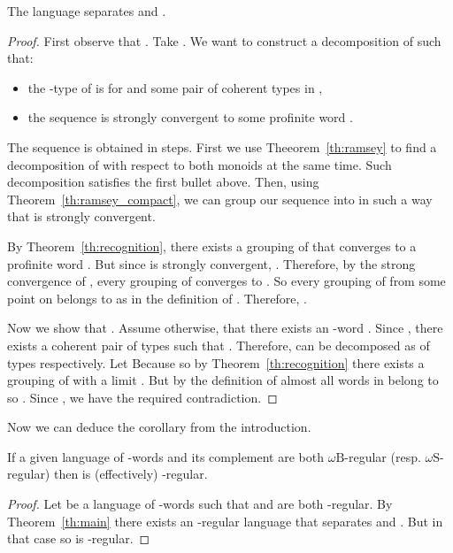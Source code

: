 \documentclass{LMCS}
\newcommand{\wB}{\ensuremath{\omega \mathrm{B}}\xspace}
\newcommand{\wS}{\ensuremath{\omega \mathrm{S}}\xspace}
\begin{document}
\begin{lemma}
The language  separates  and .
\end{lemma}

\begin{proof}
First observe that . Take . We want to construct a decomposition  of  such that:
\begin{itemize}
\item the -type of  is  for  and some pair of coherent types  in ,
\item the sequence  is strongly convergent to some profinite word .
\end{itemize}

The sequence  is obtained in steps. First we use Theeorem~\ref{th:ramsey} to find a decomposition of  with respect to both monoids  at the same time. Such decomposition satisfies the first bullet above. Then, using Theorem~\ref{th:ramsey_compact}, we can group our sequence into  in such a way that  is strongly convergent.

By Theorem~\ref{th:recognition}, there exists a grouping  of  that converges to a profinite word . But since  is strongly convergent, . Therefore, by the strong convergence of , every grouping of  converges to . So every grouping of  from some point on belongs to  as in the definition of . Therefore, .

Now we show that . Assume otherwise, that there exists an -word . Since , there exists a coherent pair of types  such that . Therefore,  can be decomposed as  of types  respectively. Let  Because  so by Theorem~\ref{th:recognition} there exists a grouping  of  with a limit  . But by the definition of  almost all words in  belong to  so . Since , we have the required contradiction.
\end{proof}

Now we can deduce the corollary from the introduction.

\begin{corollary}\label{cl:delta}
If a given language of -words  and its complement  are both \wB-regular (resp. \wS-regular) then  is (effectively) -regular.
\end{corollary}

\begin{proof}
Let  be a language of -words such that  and  are both -regular. By Theorem~\ref{th:main} there exists an -regular language  that separates  and . But in that case  so  is -regular.
\end{proof}
\end{document}
